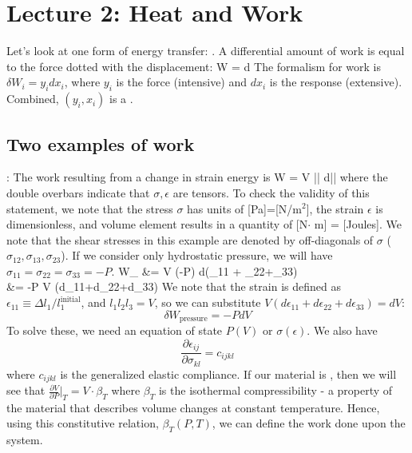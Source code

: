 \documentclass[12pt]{article}
\begin{document}

\section{Lecture 2: Heat and Work}
Let's look at one form of energy transfer: . A differential amount of work is equal to the force dotted with the displacement:
\eqs
\delta W =  \cdot d
\eqe
The formalism for work is $\delta W_i = y_i dx_i$, where $y_i$ is the force (intensive) and $dx_i$ is the response (extensive). Combined, $(y_i, x_i)$ is a .
\subsection{Two examples of work}
: The work resulting from a change in strain energy is 
\eqs
\delta W = V \bar{\bar{\sigma}} \cdot d\bar{\bar{\epsilon}}
\eqe 
where the double overbars indicate that $\sigma, \epsilon$ are tensors.  To check the validity of this statement, we note that the stress $\sigma$ has units of [Pa]=[N/$\text{m}^2$], the strain $\epsilon$ is dimensionless, and volume element results in a quantity of [N$\cdot$ m] = [Joules]. We note that the shear stresses in this example are denoted by off-diagonals of $\sigma$ ($\sigma_{12}, \sigma_{13}, \sigma_{23}$).  If we consider only hydrostatic pressure, we will have $\sigma_{11}=\sigma_{22}=\sigma_{33}=-P$.
\eqs
\delta W_ &= V \cdot (-P) d(\epsilon_{11} + \epsilon_{22}+\epsilon_{33})\\
&= -P V (d\epsilon_{11}+d\epsilon_{22}+d\epsilon_{33})
\eqe
We note that the strain is defined as $\epsilon_{11} \equiv \Delta l_1 / l_1^{\text{initial}}$, and $l_1 l_2 l_3 = V$, so we can substitute $V (d\epsilon_{11}+d\epsilon_{22}+d\epsilon_{33}) = dV$:
\begin{equation}
\delta W_\text{pressure} = -P dV
\end{equation}
To solve these, we need an equation of state $P(V)$ or $\sigma(\epsilon)$.  We also have
\begin{equation}
\frac{\partial \epsilon_{ij}}{\partial \sigma_{kl}} = c_{ijkl}
\end{equation}
where $c_{ijkl}$ is the generalized elastic compliance.  If our material is , then we will see that $\frac{\partial V}{\partial P}|_T = V \cdot \beta_T$ where $\beta_T$ is the isothermal compressibility - a property of the material that describes volume changes at constant temperature. Hence, using this constitutive relation, $\beta_T(P,T)$, we can define the work done upon the system. \\
\end{document}

